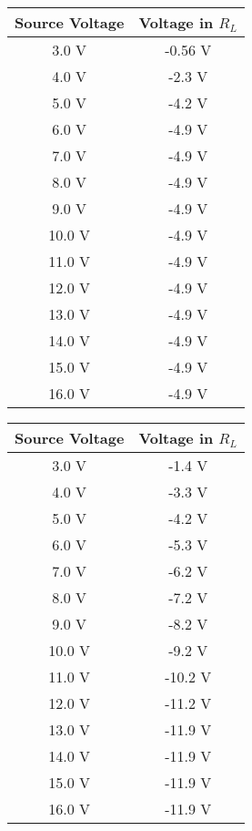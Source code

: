\begin{multicols}{2}
\begin{tasks}
\begin{center}
\begin{tabular}[.5cm]{ c c }
\toprule
Source Voltage & Voltage in $R_{L}$ \\
\midrule
3.0 V & -0.56 V \\
\cmidrule{1-2}
4.0 V & -2.3 V \\
\cmidrule{1-2}
5.0 V & -4.2 V \\
\cmidrule{1-2}
6.0 V & -4.9 V \\
\cmidrule{1-2}
7.0 V & -4.9 V \\
\cmidrule{1-2}
8.0 V & -4.9 V \\
\cmidrule{1-2}
9.0 V & -4.9 V \\
\cmidrule{1-2}
10.0 V & -4.9 V \\
\cmidrule{1-2}
11.0 V & -4.9 V \\
\cmidrule{1-2}
12.0 V & -4.9 V \\
\cmidrule{1-2}
13.0 V & -4.9 V \\
\cmidrule{1-2}
14.0 V & -4.9 V \\
\cmidrule{1-2}
15.0 V & -4.9 V \\
\cmidrule{1-2}
16.0 V & -4.9 V \\
\bottomrule
\end{tabular}
\end{center} 

\begin{center}
\begin{tabular}[.5cm]{ c c }
\toprule
Source Voltage & Voltage in $R_{L}$ \\
\midrule
3.0 V & -1.4 V \\
\cmidrule{1-2}
4.0 V & -3.3 V \\
\cmidrule{1-2}
5.0 V & -4.2 V \\
\cmidrule{1-2}
6.0 V & -5.3 V \\
\cmidrule{1-2}
7.0 V & -6.2 V \\
\cmidrule{1-2}
8.0 V & -7.2 V \\
\cmidrule{1-2}
9.0 V & -8.2 V \\
\cmidrule{1-2}
10.0 V & -9.2 V \\
\cmidrule{1-2}
11.0 V & -10.2 V \\
\cmidrule{1-2}
12.0 V & -11.2 V \\
\cmidrule{1-2}
13.0 V & -11.9 V \\
\cmidrule{1-2}
14.0 V & -11.9 V \\
\cmidrule{1-2}
15.0 V & -11.9 V \\
\cmidrule{1-2}
16.0 V & -11.9 V \\
\bottomrule
\end{tabular}
\end{center} 
\end{tasks}
\end{multicols} 

\pagebreak